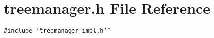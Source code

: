 \section{treemanager.h File Reference}
\label{treemanager_8h}
{\tt \#include \char`\"{}treemanager\_\-impl.h\char`\"{}}\par

